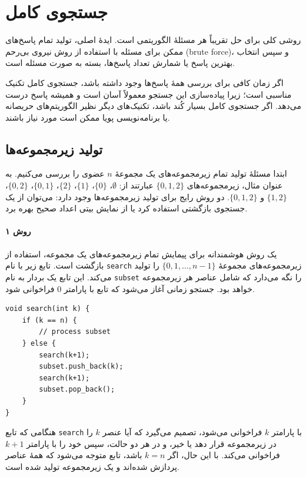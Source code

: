 \chapter{جستجوی کامل}

روشی کلی برای حل تقریباً هر مسئلهٔ الگوریتمی است.
ایدهٔ اصلی، تولید تمام پاسخ‌های ممکن برای مسئله با استفاده از روش نیروی بی‌رحم (brute force)،
و سپس انتخاب بهترین پاسخ یا شمارش تعداد پاسخ‌ها، بسته به صورت مسئله است.

اگر زمان کافی برای بررسی همهٔ پاسخ‌ها وجود داشته باشد، جستجوی کامل تکنیک مناسبی است؛
زیرا پیاده‌سازی این جستجو معمولاً آسان است
و همیشه پاسخ درست می‌دهد.
اگر جستجوی کامل بسیار کُند باشد،
تکنیک‌های دیگر نظیر الگوریتم‌های حریصانه یا
برنامه‌نویسی پویا ممکن است مورد نیاز باشند.

\section{تولید زیرمجموعه‌ها}


ابتدا مسئلهٔ تولید
تمام زیرمجموعه‌های یک مجموعهٔ $n$ عضوی را بررسی می‌کنیم.
به عنوان مثال، زیرمجموعه‌های $\{0,1,2\}$ عبارتند از:
$\emptyset$، $\{0\}$، $\{1\}$، $\{2\}$، $\{0,1\}$،
$\{0,2\}$، $\{1,2\}$ و $\{0,1,2\}$.
دو روش رایج برای تولید زیرمجموعه‌ها وجود دارد:
می‌توان از یک جستجوی بازگشتی استفاده کرد
یا از نمایش بیتی اعداد صحیح بهره برد.

\subsubsection{روش ۱}

یک روش هوشمندانه برای پیمایش تمام زیرمجموعه‌های
یک مجموعه، استفاده از بازگشت است.
تابع زیر با نام \texttt{search}
زیرمجموعه‌های مجموعهٔ
$\{0,1,\ldots,n-1\}$ را تولید می‌کند.
این تابع یک بردار به نام \texttt{subset} را نگه می‌دارد
که شامل عناصر هر زیرمجموعه خواهد بود.
جستجو زمانی آغاز می‌شود که تابع
با پارامتر 0 فراخوانی شود.

\begin{lstlisting}
void search(int k) {
    if (k == n) {
        // process subset
    } else {
        search(k+1);
        subset.push_back(k);
        search(k+1);
        subset.pop_back();
    }
}
\end{lstlisting}

هنگامی که تابع \texttt{search}
با پارامتر $k$ فراخوانی می‌شود،
تصمیم می‌گیرد که آیا عنصر
$k$ را در زیرمجموعه قرار دهد یا خیر،
و در هر دو حالت،
سپس خود را با پارامتر $k+1$ فراخوانی می‌کند.
با این حال، اگر $k=n$ باشد، تابع متوجه می‌شود که
همهٔ عناصر پردازش شده‌اند
و یک زیرمجموعه تولید شده است.

